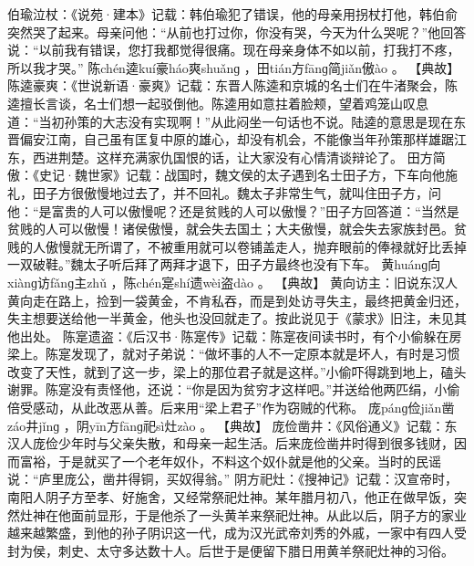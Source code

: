 \documentclass[12pt,UTF8]{ctexbook}
\begin{document}
伯瑜泣杖：《说苑·建本》记载：韩伯瑜犯了错误，他的母亲用拐杖打他，韩伯俞突然哭了起来。母亲问他：“从前也打过你，你没有哭，今天为什么哭呢？”他回答说：“以前我有错误，您打我都觉得很痛。现在母亲身体不如以前，打我打不疼，所以我才哭。”
陈chén逵kuí豪háo爽shuǎnɡ
，田tián方fānɡ简jiǎn傲ào
。
【典故】
陈逵豪爽：《世说新语·豪爽》记载：东晋人陈逵和京城的名士们在牛渚聚会，陈逵擅长言谈，名士们想一起驳倒他。陈逵用如意拄着脸颊，望着鸡笼山叹息道：“当初孙策的大志没有实现啊！”从此闷坐一句话也不说。陆逵的意思是现在东晋偏安江南，自己虽有匡复中原的雄心，却没有机会，不能像当年孙策那样雄踞江东，西进荆楚。这样充满家仇国恨的话，让大家没有心情清谈辩论了。
田方简傲：《史记·魏世家》记载：战国时，魏文侯的太子遇到名士田子方，下车向他施礼，田子方很傲慢地过去了，并不回礼。魏太子非常生气，就叫住田子方，问他：“是富贵的人可以傲慢呢？还是贫贱的人可以傲慢？”田子方回答道：“当然是贫贱的人可以傲慢！诸侯傲慢，就会失去国土；大夫傲慢，就会失去家族封邑。贫贱的人傲慢就无所谓了，不被重用就可以卷铺盖走人，抛弃眼前的俸禄就好比丢掉一双破鞋。”魏太子听后拜了两拜才退下，田子方最终也没有下车。
黄huánɡ向xiànɡ访fǎnɡ主zhǔ
，陈chén寔shí遗wèi盗dào
。
【典故】
黄向访主：旧说东汉人黄向走在路上，捡到一袋黄金，不肯私吞，而是到处访寻失主，最终把黄金归还，失主想要送给他一半黄金，他头也没回就走了。按此说见于《蒙求》旧注，未见其他出处。
陈寔遗盗：《后汉书·陈寔传》记载：陈寔夜间读书时，有个小偷躲在房梁上。陈寔发现了，就对子弟说：“做坏事的人不一定原本就是坏人，有时是习惯改变了天性，就到了这一步，梁上的那位君子就是这样。”小偷吓得跳到地上，磕头谢罪。陈寔没有责怪他，还说：“你是因为贫穷才这样吧。”并送给他两匹绢，小偷倍受感动，从此改恶从善。后来用“梁上君子”作为窃贼的代称。
庞pánɡ俭jiǎn凿záo井jǐnɡ
，阴yīn方fānɡ祀sì灶zào
。
【典故】
庞俭凿井：《风俗通义》记载：东汉人庞俭少年时与父亲失散，和母亲一起生活。后来庞俭凿井时得到很多钱财，因而富裕，于是就买了一个老年奴仆，不料这个奴仆就是他的父亲。当时的民谣说：“庐里庞公，凿井得铜，买奴得翁。”
阴方祀灶：《搜神记》记载：汉宣帝时，南阳人阴子方至孝、好施舍，又经常祭祀灶神。某年腊月初八，他正在做早饭，突然灶神在他面前显形，于是他杀了一头黄羊来祭祀灶神。从此以后，阴子方的家业越来越繁盛，到他的孙子阴识这一代，成为汉光武帝刘秀的外戚，一家中有四人受封为侯，刺史、太守多达数十人。后世于是便留下腊日用黄羊祭祀灶神的习俗。
\end{document}

